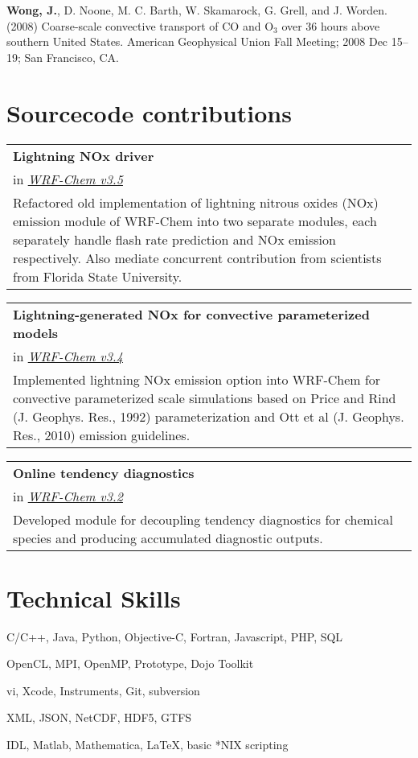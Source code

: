 \documentclass[overlap,12pt,centered]{res}
\makeatletter
\newcommand{\block}{\begin{tabular}{@{}p{6.5in}}}
\makeatother
\begin{document}
\begin{resume}
		\textbf{Wong, J.}, D. Noone, M. C. Barth, W. Skamarock, G. Grell, and J. Worden. (2008) Coarse-scale convective transport of CO and O$_3$ over 36 hours above southern United States. American Geophysical Union Fall Meeting; 2008 Dec 15--19; San Francisco, CA.
		
		
		\newpage\section{\sc Sourcecode contributions}
		
		\block
		{\bf Lightning NOx driver} \\
		in \href{http://www.mmm.ucar.edu/wrf/users/}{\it WRF-Chem v3.5} \\
		Refactored old implementation of lightning nitrous oxides (NOx) emission module of WRF-Chem into two separate modules, each separately handle flash rate prediction and NOx emission respectively. Also mediate concurrent contribution from scientists from Florida State University.
		\end{tabular}
		
		\block
		{\bf Lightning-generated NOx for convective parameterized models} \\
		in \href{http://www.mmm.ucar.edu/wrf/users/}{\it WRF-Chem v3.4} \\
		Implemented lightning NOx emission option into WRF-Chem for convective parameterized scale simulations based on Price and Rind (J. Geophys. Res., 1992) parameterization and Ott et al (J. Geophys. Res., 2010) emission guidelines.
		\end{tabular}
		
		\block
		{\bf Online tendency diagnostics} \\
		in \href{http://www.mmm.ucar.edu/wrf/users/}{\it WRF-Chem v3.2} \\
		Developed module for decoupling tendency diagnostics for chemical species and producing accumulated diagnostic outputs.
		\end{tabular}
		
		\section{\sc Technical Skills}\vspace{.15in}
		\begin{description}
		\setlength{\itemsep}{-.02in}
			\item[Languages:] C/C++, Java, Python, Objective-C, Fortran, Javascript, PHP, SQL
			\item[Frameworks and libraries:]  OpenCL, MPI, OpenMP, Prototype, Dojo Toolkit
			\item[IDEs and tools:] vi, Xcode, Instruments, Git, subversion
			\item[Data formats:] XML, JSON, NetCDF, HDF5, GTFS
			\item[Other tools:] IDL, Matlab, Mathematica, \LaTeX, basic *NIX scripting
		\end{description}
		

\end{resume}
\end{document}
